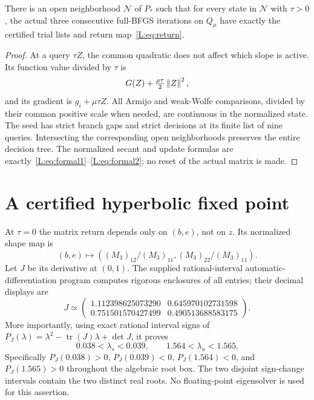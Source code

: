 \begin{lemma}\label{L:lem:agreement}
There is an open neighborhood $\mathcal N$ of $P_*$ such that for every state in $\mathcal N$ with $\tau>0$, the actual three consecutive full-BFGS iterations on $Q_\mu$ have exactly the certified trial lists and return map~\eqref{L:eq:return}.
\end{lemma}
\begin{proof}
At a query $\tau Z$, the common quadratic does not affect which slope is active. Its function value divided by $\tau$ is
\[
 G(Z)+\tfrac{\mu\tau}{2}\left\lVert Z\right\rVert^2,
\]
and its gradient is $g_i+\mu\tau Z$. All Armijo and weak-Wolfe comparisons, divided by their common positive scale when needed, are continuous in the normalized state. The seed has strict branch gaps and strict decisions at its finite list of nine queries. Intersecting the corresponding open neighborhoods preserves the entire decision tree. The normalized secant and update formulas are exactly~\eqref{L:eq:formal1}--\eqref{L:eq:formal2}; no reset of the actual matrix is made.
\end{proof}


\setcounter{section}{3}
\setcounter{theorem}{2}
\setcounter{lemma}{1}
\setcounter{corollary}{0}
\setcounter{proposition}{0}
\setcounter{remark}{0}
\setcounter{equation}{2}
\section{A certified hyperbolic fixed point}
At $\tau=0$ the matrix return depends only on $(b,e)$, not on $z$. Its normalized shape map is
\[
 (b,e)\longmapsto ((M_3)_{12}/(M_3)_{11},(M_3)_{22}/(M_3)_{11}).
\]
Let $J$ be its derivative at $(0,1)$. The supplied rational-interval automatic-differentiation program computes rigorous enclosures of all entries; their decimal displays are
\[
 J\simeq\begin{pmatrix}
 1.112398625073290&0.645970102731598\\
 0.751501570427499&0.490513688583175
 \end{pmatrix}.
\]
More importantly, using exact rational interval signs of
$P_J(\lambda)=\lambda^2-\operatorname{tr}(J)\lambda+\det J$, it proves
\begin{equation}\label{L:eq:eigshape}
 0.038<\lambda_s<0.039,\qquad 1.564<\lambda_u<1.565.
\end{equation}
Specifically $P_J(0.038)>0$, $P_J(0.039)<0$, $P_J(1.564)<0$, and $P_J(1.565)>0$ throughout the algebraic root box. The two disjoint sign-change intervals contain the two distinct real roots. No floating-point eigensolver is used for this assertion.

